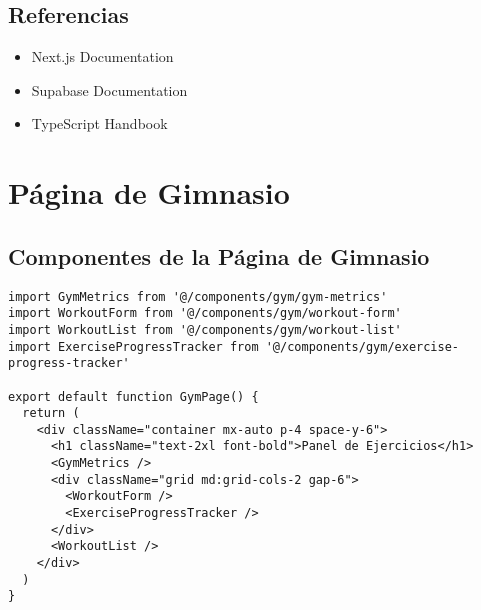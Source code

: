 \documentclass[12pt,a4paper]{report}
\begin{document}
\section{Referencias}
\begin{itemize}
    \item Next.js Documentation
    \item Supabase Documentation
    \item TypeScript Handbook
\end{itemize}

\chapter{Página de Gimnasio}

\section{Componentes de la Página de Gimnasio}
\begin{verbatim}
import GymMetrics from '@/components/gym/gym-metrics'
import WorkoutForm from '@/components/gym/workout-form'
import WorkoutList from '@/components/gym/workout-list'
import ExerciseProgressTracker from '@/components/gym/exercise-progress-tracker'

export default function GymPage() {
  return (
    <div className="container mx-auto p-4 space-y-6">
      <h1 className="text-2xl font-bold">Panel de Ejercicios</h1>
      <GymMetrics />
      <div className="grid md:grid-cols-2 gap-6">
        <WorkoutForm />
        <ExerciseProgressTracker />
      </div>
      <WorkoutList />
    </div>
  )
}
\end{verbatim}
\end{document}
